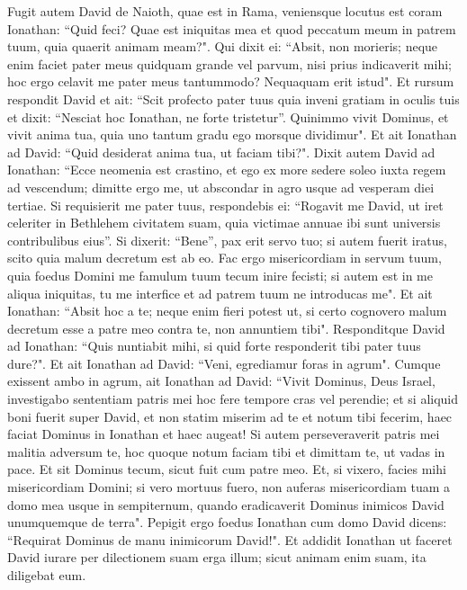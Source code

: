 \begin{biblechapter}  
\verse Fugit autem David de Naioth, quae est in Rama, veniensque locutus est coram Ionathan: “Quid feci? Quae est iniquitas mea et quod peccatum meum in patrem tuum, quia quaerit animam meam?". 
\verse Qui dixit ei: “Absit, non morieris; neque enim faciet pater meus quidquam grande vel parvum, nisi prius indicaverit mihi; hoc ergo celavit me pater meus tantummodo? Nequaquam erit istud". 
\verse Et rursum respondit David et ait: “Scit profecto pater tuus quia inveni gratiam in oculis tuis et dixit: “Nesciat hoc Ionathan, ne forte tristetur”. Quinimmo vivit Dominus, et vivit anima tua, quia uno tantum gradu ego morsque dividimur". 
\verse Et ait Ionathan ad David: “Quid desiderat anima tua, ut faciam tibi?". 
\verse Dixit autem David ad Ionathan: “Ecce neomenia est crastino, et ego ex more sedere soleo iuxta regem ad vescendum; dimitte ergo me, ut abscondar in agro usque ad vesperam diei tertiae. 
\verse Si requisierit me pater tuus, respondebis ei: “Rogavit me David, ut iret celeriter in Bethlehem civitatem suam, quia victimae annuae ibi sunt universis contribulibus eius”. 
\verse Si dixerit: “Bene”, pax erit servo tuo; si autem fuerit iratus, scito quia malum decretum est ab eo. 
\verse Fac ergo misericordiam in servum tuum, quia foedus Domini me famulum tuum tecum inire fecisti; si autem est in me aliqua iniquitas, tu me interfice et ad patrem tuum ne introducas me". 
\verse Et ait Ionathan: “Absit hoc a te; neque enim fieri potest ut, si certo cognovero malum decretum esse a patre meo contra te, non annuntiem tibi". 
\verse Responditque David ad Ionathan: “Quis nuntiabit mihi, si quid forte responderit tibi pater tuus dure?". 
\verse Et ait Ionathan ad David: “Veni, egrediamur foras in agrum". Cumque exissent ambo in agrum, 
\verse ait Ionathan ad David: “Vivit Dominus, Deus Israel, investigabo sententiam patris mei hoc fere tempore cras vel perendie; et si aliquid boni fuerit super David, et non statim miserim ad te et notum tibi fecerim, 
\verse haec faciat Dominus in Ionathan et haec augeat! Si autem perseveraverit patris mei malitia adversum te, hoc quoque notum faciam tibi et dimittam te, ut vadas in pace. Et sit Dominus tecum, sicut fuit cum patre meo. 
\verse Et, si vixero, facies mihi misericordiam Domini; si vero mortuus fuero,  
\verse non auferas misericordiam tuam a domo mea usque in sempiternum, quando eradicaverit Dominus inimicos David unumquemque de terra". 
\verse Pepigit ergo foedus Ionathan cum domo David dicens: “Requirat Dominus de manu inimicorum David!". 
\verse Et addidit Ionathan ut faceret David iurare per dilectionem suam erga illum; sicut animam enim suam, ita diligebat eum. 

\end{biblechapter}
